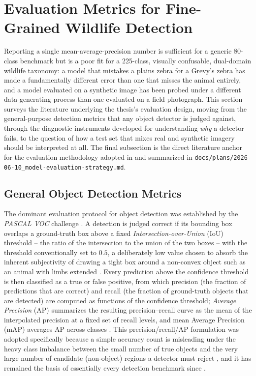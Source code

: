 \section{Evaluation Metrics for Fine-Grained Wildlife Detection}\label{sec:lit_evaluation_metrics}

Reporting a single mean-average-precision number is sufficient for a generic 80-class benchmark but is a poor fit for a 225-class, visually confusable, dual-domain wildlife taxonomy: a model that mistakes a plains zebra for a Grevy's zebra has made a fundamentally different error than one that misses the animal entirely, and a model evaluated on a synthetic image has been probed under a different data-generating process than one evaluated on a field photograph. This section surveys the literature underlying the thesis's evaluation design, moving from the general-purpose detection metrics that any object detector is judged against, through the diagnostic instruments developed for understanding \textit{why} a detector fails, to the question of how a test set that mixes real and synthetic imagery should be interpreted at all. The final subsection is the direct literature anchor for the evaluation methodology adopted in  and summarized in \texttt{docs/plans/2026-06-10\_model-evaluation-strategy.md}.

\subsection{General Object Detection Metrics}\label{sec:lit_detection_metrics}

The dominant evaluation protocol for object detection was established by the \textit{PASCAL VOC} challenge \cite{everinghamPascalVisualObject2010}. A detection is judged correct if its bounding box overlaps a ground-truth box above a fixed \textit{Intersection-over-Union} (IoU) threshold -- the ratio of the intersection to the union of the two boxes -- with the threshold conventionally set to $0.5$, a deliberately low value chosen to absorb the inherent subjectivity of drawing a tight box around a non-convex object such as an animal with limbs extended \cite{everinghamPascalVisualObject2010}. Every prediction above the confidence threshold is then classified as a true or false positive, from which precision (the fraction of predictions that are correct) and recall (the fraction of ground-truth objects that are detected) are computed as functions of the confidence threshold; \textit{Average Precision} (AP) summarizes the resulting precision--recall curve as the mean of the interpolated precision at a fixed set of recall levels, and mean Average Precision (mAP) averages AP across classes \cite{everinghamPascalVisualObject2010}. This precision/recall/AP formulation was adopted specifically because a simple accuracy count is misleading under the heavy class imbalance between the small number of true objects and the very large number of candidate (non-object) regions a detector must reject \cite{everinghamPascalVisualObject2010}, and it has remained the basis of essentially every detection benchmark since \cite{zouObjectDetection202023}.

